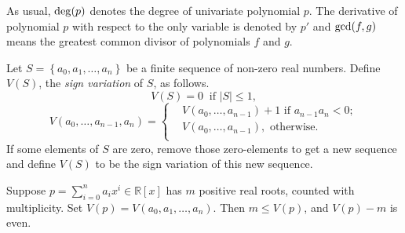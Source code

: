 \documentclass[10pt,a4paper]{article}
\def \RR {{\mathbb R}}
\def \gcd {{\rm gcd}}
\def \deg {{\rm deg}}
\begin{document}
As usual, $\deg(p)$ denotes the degree of univariate polynomial $p$. The derivative of polynomial $p$ with respect to the only variable is denoted by $p'$ and $\gcd(f,g)$ means the greatest common divisor of polynomials $f$ and $g$.

\begin{note}
Let $S=\left\{ a_0,a_1,\ldots,a_n \right\}$ be a finite sequence of non-zero real numbers. Define $V(S)$, the {\em sign variation} of $S$, as follows.
\[V(S)=0\ \text{ if } |S|\le1,\]
\[  V(a_0,\ldots,a_{n-1},a_n)=  \left\{\begin{aligned}
 &  V(a_0,\ldots,a_{n-1})+1 \text{ if }a_{n-1}a_n<0;\\
&V(a_0,\ldots,a_{n-1}), \text{ otherwise}.\\
	\end{aligned}
	\right.
\]
If some elements of $S$ are zero, remove those zero-elements to get a new sequence and define $V(S)$ to be the sign variation of this new sequence.
\end{note}





\begin{theorem} \label{thm:des}
  Suppose $p=\sum_{i=0}^na_ix^i\in\RR[x]$ has $m$ positive real roots, counted with multiplicity. Set $V(p)=V(a_0,a_1,\ldots,a_n)$. Then $m\le V(p)$, and $V(p)-m$ is even.
\end{theorem}

\end{document}
